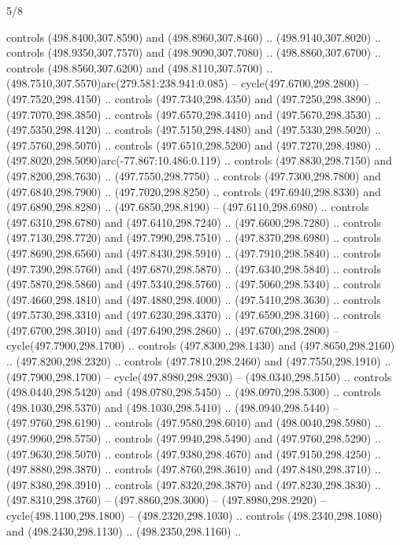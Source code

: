 \begin{flagdescription}{5/8}
\begin{scope}[xshift=0.5\flaglength,yshift=0.5\flagwidth,scale=\flagwidth/475.63]
\begin{scope}[y=0.8pt, x=0.8pt, yscale=-1, xscale=1,shift={(-450,-300)}]
\begin{scope}[cm={{1.0,0.0,0.0,1.0,(-0.0002,0.12556)}},cm={{1.0,0.0,0.0,1.0,(0.00179,0.0)}}]
\begin{scope}[cm={{1.11592,0.0,0.0,1.11592,(-106.89933,-41.77764)}}]
\begin{scope}[draw=black,fill=cfff]
\begin{scope}[fill=black]
  controls (498.8400,307.8590) and (498.8960,307.8460) .. (498.9140,307.8020) ..
  controls (498.9350,307.7570) and (498.9090,307.7080) .. (498.8860,307.6700) ..
  controls (498.8560,307.6200) and (498.8110,307.5700) ..
  (498.7510,307.5570)arc(279.581:238.941:0.085) -- cycle(497.6700,298.2800) --
  (497.7520,298.4150) .. controls (497.7340,298.4350) and (497.7250,298.3890) ..
  (497.7070,298.3850) .. controls (497.6570,298.3410) and (497.5670,298.3530) ..
  (497.5350,298.4120) .. controls (497.5150,298.4480) and (497.5330,298.5020) ..
  (497.5760,298.5070) .. controls (497.6510,298.5200) and (497.7270,298.4980) ..
  (497.8020,298.5090)arc(-77.867:10.486:0.119) .. controls (497.8830,298.7150)
  and (497.8200,298.7630) .. (497.7550,298.7750) .. controls (497.7300,298.7800)
  and (497.6840,298.7900) .. (497.7020,298.8250) .. controls (497.6940,298.8330)
  and (497.6890,298.8280) .. (497.6850,298.8190) -- (497.6110,298.6980) ..
  controls (497.6310,298.6780) and (497.6410,298.7240) .. (497.6600,298.7280) ..
  controls (497.7130,298.7720) and (497.7990,298.7510) .. (497.8370,298.6980) ..
  controls (497.8690,298.6560) and (497.8430,298.5910) .. (497.7910,298.5840) ..
  controls (497.7390,298.5760) and (497.6870,298.5870) .. (497.6340,298.5840) ..
  controls (497.5870,298.5860) and (497.5340,298.5760) .. (497.5060,298.5340) ..
  controls (497.4660,298.4810) and (497.4880,298.4000) .. (497.5410,298.3630) ..
  controls (497.5730,298.3310) and (497.6230,298.3370) .. (497.6590,298.3160) ..
  controls (497.6700,298.3010) and (497.6490,298.2860) .. (497.6700,298.2800) --
  cycle(497.7900,298.1700) .. controls (497.8300,298.1430) and
  (497.8650,298.2160) .. (497.8200,298.2320) .. controls (497.7810,298.2460) and
  (497.7550,298.1910) .. (497.7900,298.1700) -- cycle(497.8980,298.2930) --
  (498.0340,298.5150) .. controls (498.0440,298.5420) and (498.0780,298.5450) ..
  (498.0970,298.5300) .. controls (498.1030,298.5370) and (498.1030,298.5410) ..
  (498.0940,298.5440) -- (497.9760,298.6190) .. controls (497.9580,298.6010) and
  (498.0040,298.5980) .. (497.9960,298.5750) .. controls (497.9940,298.5490) and
  (497.9760,298.5290) .. (497.9630,298.5070) .. controls (497.9380,298.4670) and
  (497.9150,298.4250) .. (497.8880,298.3870) .. controls (497.8760,298.3610) and
  (497.8480,298.3710) .. (497.8380,298.3910) .. controls (497.8320,298.3870) and
  (497.8230,298.3830) .. (497.8310,298.3760) -- (497.8860,298.3000) --
  (497.8980,298.2920) -- cycle(498.1100,298.1800) -- (498.2320,298.1030) ..
  controls (498.2340,298.1080) and (498.2430,298.1130) .. (498.2350,298.1160) ..

\end{scope}
\end{scope}
\end{scope}
\end{scope}
\end{scope}
\end{scope}
\end{flagdescription}
